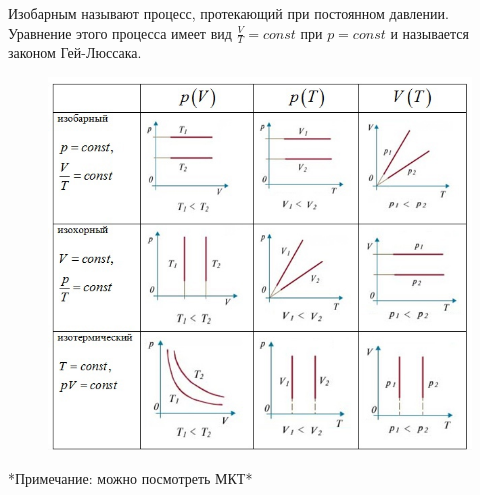 \begin{definition}
    Изобарным называют процесс, протекающий при постоянном давлении. 
    Уравнение этого процесса имеет вид $\frac{V}{T} = const$ при $p = const$ и называется законом Гей-Люссака.
\end{definition}

\begin{figure}[h]
    \centering
    \includegraphics[width=0.4\linewidth]{imgs/q13i1.jpg}
\end{figure}

*Примечание: можно посмотреть МКТ*
